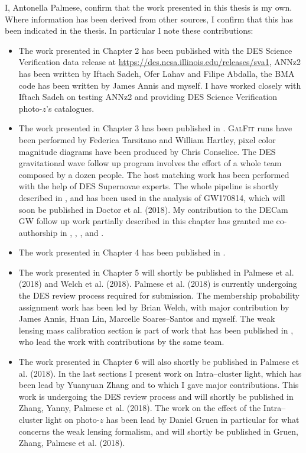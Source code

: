 \thispagestyle{empty}

\vspace*{3cm}

\begin{flushleft}
I, Antonella Palmese, confirm that the work presented in this thesis is my own. Where
information has been derived from other sources, I confirm that this has been indicated in
the thesis. In particular I note these contributions:
\begin{itemize}
\item The work presented in Chapter 2 has been published with the DES Science Verification data release at \url{https://des.ncsa.illinois.edu/releases/sva1}, ANNz2 has been written by Iftach Sadeh, Ofer Lahav and Filipe Abdalla, the BMA code has been written by James Annis and myself. I have worked closely with Iftach Sadeh on testing ANNz2 and providing DES Science Verification photo-$z$'s catalogues.
\item The work presented in Chapter 3 has been published in \citet{palmese17}. \textsc{GalFit} runs have been performed by Federica Tarsitano and William Hartley, pixel color magnitude diagrams have been produced by Chris Conselice. The DES gravitational wave follow up program involves the effort of a whole team composed by a dozen people. The host matching work has been performed with the help of DES Supernovae experts. The whole pipeline is shortly described in \citet{herner}, and has been used in the analysis of GW170814, which will soon be published in Doctor et al. (2018). My contribution to the DECam GW follow up work partially described in this chapter has granted me co-authorship in \citet{MMApaper}, \citet{gw170817h0}, \citet{marcelle17}, \citet{scolnic} and \citet{Cowperthwaite}.
\item The work presented in Chapter 4 has been published in \citet{palmese16}.
\item The work presented in Chapter 5 will shortly be published in Palmese et al. (2018) and Welch et al. (2018). Palmese et al. (2018) is currently undergoing the DES review process required for submission. The membership probability assignment work has been led by Brian Welch, with major contribution by James Annis, Huan Lin, Marcelle Soares--Santos and myself. The weak lensing mass calibration section is part of work that has been published in \citet{maria}, who lead the work with contributions by the same team.
\item The work presented in Chapter 6 will also shortly be published in Palmese et al. (2018). In the last sections I present work on Intra--cluster light, which has been lead by Yuanyuan Zhang and to which I gave major contributions. This work is undergoing the DES review process and will shortly be published in Zhang, Yanny, Palmese et al. (2018). The work on the effect of the Intra--cluster light on photo-$z$ has been lead by Daniel Gruen in particular for what concerns the weak lensing formalism, and will shortly be published in Gruen, Zhang, Palmese et al. (2018).
\end{itemize}
\end{flushleft}